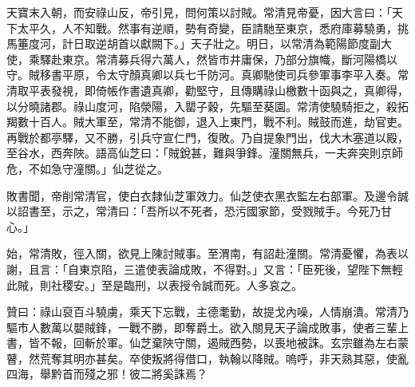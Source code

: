 \begin{pinyinscope}
 天寶末入朝，而安祿山反，帝引見，問何策以討賊。常清見帝憂，因大言曰：「天下太平久，人不知戰。然事有逆順，勢有奇變，臣請馳至東京，悉府庫募驍勇，挑馬箠度河，計日取逆胡首以獻闕下。」天子壯之。明日，以常清為範陽節度副大使，乘驛赴東京。常清募兵得六萬人，然皆市井庸保，乃部分旗幟，斷河陽橋以守。賊移書平原，令太守顏真卿以兵七千防河。真卿馳使司兵參軍事李平入奏。常清取平表發視，即倚帳作書遺真卿，勸堅守，且傳購祿山檄數十函與之，真卿得，以分曉諸郡。祿山度河，陷滎陽，入罌子穀，先驅至葵園。常清使驍騎拒之，殺拓羯數十百人。賊大軍至，常清不能御，退入上東門，戰不利。賊鼓而進，劫官吏。再戰於都亭驛，又不勝，引兵守宣仁門，復敗。乃自提象門出，伐大木塞道以殿，至谷水，西奔陜。語高仙芝曰：「賊銳甚，難與爭鋒。潼關無兵，一夫奔突則京師危，不如急守潼關。」仙芝從之。



 敗書聞，帝削常清官，使白衣隸仙芝軍效力。仙芝使衣黑衣監左右部軍。及邊令誠以詔書至，示之，常清曰：「吾所以不死者，恐污國家節，受戮賊手。今死乃甘心。」



 始，常清敗，徑入關，欲見上陳討賊事。至渭南，有詔赴潼關。常清憂懼，為表以謝，且言：「自東京陷，三遣使表論成敗，不得對。」又言：「臣死後，望陛下無輕此賊，則社稷安。」至是臨刑，以表授令誠而死。人多哀之。



 贊曰：祿山裒百斗驍虜，乘天下忘戰，主德耄勤，故提戈內噪，人情崩潰。常清乃驅市人數萬以嬰賊鋒，一戰不勝，即奪爵土。欲入關見天子論成敗事，使者三輩上書，皆不報，回斬於軍。仙芝棄陜守關，遏賊西勢，以喪地被誅。玄宗雖為左右蒙瞽，然荒奪其明亦甚矣。卒使叛將得借口，執翰以降賊。嗚呼，非天熟其惡，使亂四海，舉黔首而殘之邪！彼二將奚誅焉？



\end{pinyinscope}